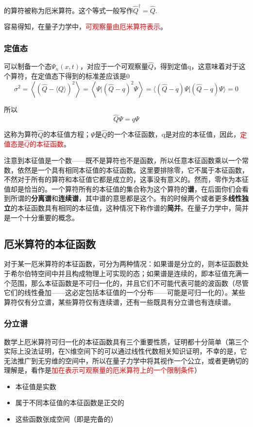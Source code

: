 \documentclass[UTF8]{ctexart}
\newcommand{\red}{\textcolor{red}}
\begin{document}
\noindent 的算符被称为厄米算符。这个等式一般写作$\hat{Q}^{\dagger} = \hat{Q}$.

    容易得知，在量子力学中，\red{可观察量由厄米算符表示}。

    \subsubsection{定值态}
    可以制备一个态$\Psi_n(x,t)$，对应于一个可观察量$\hat{Q}$，得到定值q，这意味着对于这个算符，在定值态下得到的标准差应该是0
    \begin{equation}
        \sigma^{2}=\left\langle(\hat{Q}-\langle Q\rangle)^{2}\right\rangle=\left\langle\Psi |(\hat{Q}-q)^{2} \Psi\right\rangle=\langle(\hat{Q}-q) \Psi |(\hat{Q}-q) \Psi\rangle= 0
        \end{equation}

\noindent 所以
\begin{equation}
    \hat{Q} \Psi = q \Psi
\end{equation}

\noindent 这称为算符$\hat{Q}$的本征值方程；$\Psi$是$\hat{Q}$的一个本征函数，q是对应的本征值，因此，\red{定值态是$\hat{Q}$的本征函数}。

    注意到本征值是一个数——既不是算符也不是函数，所以任意本征函数乘以一个常数，依然是一个具有相同本征值的本征函数。这里要排除零，它不属于本征函数，不然对于所有的算符和本征值它都是成立的，这事没有意义的。然而，零作为本征值却是恰当的。一个算符所有的本征值的集合称为这个算符的\textbf{谱}，在后面你们会看到所谓的\textbf{分离谱}和\textbf{连续谱}，其中谱的意思都是这个。有的时候两个或者更多\textbf{线性独立}的本征函数具有相同的本征值，这种情况下称作谱的\textbf{简并}。在量子力学中，简并是一个十分重要的概念。

    \subsection{厄米算符的本征函数}
    对于某一厄米算符的本征函数，可分为两种情况：如果谱是分立的，则本征函数处于希尔伯特空间中并且构成物理上可实现的态；如果谱是连续的，即本征值充满一个范围，那么本征函数是不可归一化的，并且它们不可能代表可能的波函数（尽管它们的线性叠加——这必定包括本征值的一个分布——可能是可归一化的）。某些算符仅有分立谱，某些算符仅有连续谱，还有一些既具有分立谱也有连续谱。

    \subsubsection{分立谱}
    数学上厄米算符可归一化的本征函数具有三个重要性质，证明都十分简单（第三个实际上没法证明，在N维空间下的可以通过线性代数相关知识证明，不幸的是，它无法推广到无穷维的空间中，所以在量子力学中将其视作一个公立，或者更确切的理解是，看作是\red{加在表示可观察量的厄米算符上的一个限制条件}）
    \begin{itemize}
        \item 本征值是实数
        \item 属于不同本征值的本征函数是正交的
        \item 这些函数张成空间（即是完备的）
    \end{itemize}
\end{document}
